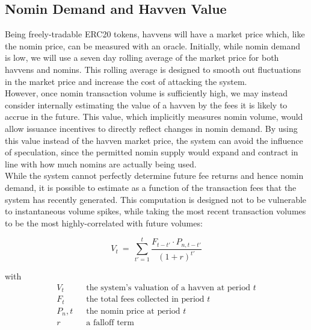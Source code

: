 \newpage

\subsection{Nomin Demand and Havven Value}

\noindent Being freely-tradable ERC20 tokens, havvens will have a market
price which, like the nomin price, can be measured with an oracle. Initially,
while nomin demand is low, we will use a seven day rolling average of the
market price for both havvens and nomins. This rolling average is designed to
smooth out fluctuations in the market price and increase the cost of
attacking the system.\\

\noindent However, once nomin transaction volume is sufficiently high, we may
instead consider internally estimating the value of a havven by the fees it
is likely to accrue in the future. This value, which implicitly measures
nomin volume, would allow issuance incentives to directly reflect changes in
nomin demand. By using this value instead of the havven market price, the
system can avoid the influence of speculation, since the permitted nomin
supply would expand and contract in line with how much nomins are actually
being used. \\

\noindent While the system cannot perfectly determine future fee returns and
hence nomin demand, it is possible to estimate as a function of the
transaction fees that the system has recently generated. This computation is
designed not to be vulnerable to instantaneous volume spikes, while taking
the most recent transaction volumes to be the most highly-correlated with
future volumes:
\vspace{3mm}

\begin{equation}
    V_{t} \ = \ \sum_{t'=1}^{t} \frac{F_{t - t'} \cdot P_{n,t - t'}}{{(1 + r)}^{t'}} \label{eq:price}
\end{equation}

with
\begin{align*} 
V_{t} \ \ & \text{ the system's valuation of a havven at period } t  \\
F_t \ \ & \text{ the total fees collected in period } t\\
P_n,t \ \ & \text{ the nomin price at period } t\\
r \ \ & \text{ a falloff term}  \\
\end{align*}

